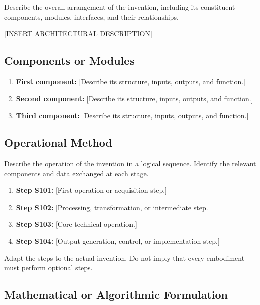 \documentclass[12pt,a4paper]{article}
\begin{document}
Describe the overall arrangement of the invention,
including its constituent components, modules, interfaces,
and their relationships.

[INSERT ARCHITECTURAL DESCRIPTION]

\subsection{Components or Modules}

\begin{enumerate}
    \item \textbf{First component:}
    [Describe its structure, inputs, outputs, and function.]

    \item \textbf{Second component:}
    [Describe its structure, inputs, outputs, and function.]

    \item \textbf{Third component:}
    [Describe its structure, inputs, outputs, and function.]
\end{enumerate}

\subsection{Operational Method}

Describe the operation of the invention in a logical
sequence. Identify the relevant components and data
exchanged at each stage.

\begin{enumerate}
    \item \textbf{Step S101:}
    [First operation or acquisition step.]

    \item \textbf{Step S102:}
    [Processing, transformation, or intermediate step.]

    \item \textbf{Step S103:}
    [Core technical operation.]

    \item \textbf{Step S104:}
    [Output generation, control, or implementation step.]
\end{enumerate}

Adapt the steps to the actual invention. Do not imply that
every embodiment must perform optional steps.

\subsection{Mathematical or Algorithmic Formulation}
\end{document}
